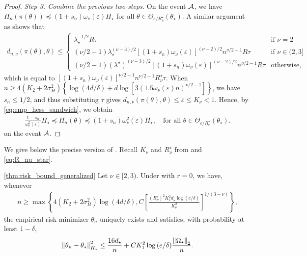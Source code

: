 \begin{proof}
    \emph{Step 3. Combine the previous two steps.}
    On the event $\mathcal{A}$, we have $H_n(\pi(\theta)) \preceq (1+s_n) \omega_\nu(\varepsilon) H_\star$ for all $\theta \in \Theta_{\varepsilon/R_\nu^\star}(\theta_\star)$.
    A similar argument as  shows that
    \begin{align*}
        d_{n, \nu}(\pi(\theta), \theta) \le
        \begin{cases}
            \lambda_\star^{-1/2} R \tau & \mbox{if } \nu = 2 \\
            (\nu/2-1) \lambda_\star^{(\nu-3)/2} [(1+s_n)\omega_\nu(\varepsilon)]^{(\nu-2)/2} n^{\nu/2-1} R \tau & \mbox{if } \nu \in (2, 3] \\
            (\nu/2-1) (\lambda^\star)^{(\nu - 3)/2} [(1+s_n)\omega_\nu(\varepsilon)]^{(\nu-2)/2} n^{\nu/2-1} R \tau & \mbox{otherwise},
        \end{cases}
    \end{align*}
    which is equal to $[(1+s_n)\omega_\nu(\varepsilon)]^{\nu/2-1} n^{\nu/2-1}R_\nu^\star \tau$.
    When $n \ge 4(K_2 + 2\sigma_H^2) \left\{ \log{(4d/\delta)} + d \log{[3(1.5 \omega_\nu(\varepsilon)n)^{\nu/2-1}]}\right\}$, we have $s_n \le 1/2$, and thus
    substituting $\tau$ gives $d_{n, \nu}(\pi(\theta), \theta) \le \varepsilon \le K_\nu < 1$.
    Hence, by \eqref{eq:emp_hess_sandwich}, we obtain
    \begin{align*}
        \frac{1-s_n}{\omega_\nu^2(\varepsilon)} H_\star \preceq H_n(\theta) \preceq (1+s_n) \omega_\nu^2(\varepsilon) H_\star, \quad \mbox{for all } \theta \in \Theta_{\varepsilon/R_\nu^\star}(\theta_\star).
    \end{align*}
    on the event $\mathcal{A}$.
\end{proof}

We give below the precise version of .
Recall $K_\nu$ and $R_\nu^\star$ from  and \eqref{eq:R_nu_star}.
\begin{customthm}{\ref{thm:risk_bound_generalized}}
    Let $\nu \in [2, 3)$.
    Under  with $r = 0$, we have,
    whenever
    \begin{align*}
        n \ge \max\left\{ 4(K_2 + 2\sigma_H^2) \log{(4d/\delta)}, C\left[\frac{(R_\nu^\star)^2 K_1^2 d_\star \log{(e/\delta)}}{K_\nu^2}\right]^{1/(3-\nu)} \right\},
    \end{align*}
    the empirical risk minimizer $\theta_n$ uniquely exists and satisfies, with probability at least $1 - \delta$,
    \begin{align*}
        \left\lVert \theta_n - \theta_\star \right\rVert^2_{H_\star} \le  \frac{16 d_\star}{n} + C K_{1}^2 \log{(e / \delta)} \frac{\left\lVert \Omega_\star \right\rVert_2}{n}.
    \end{align*}
\end{customthm}

